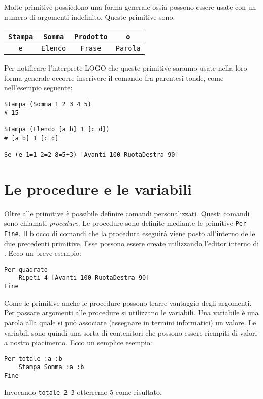 Molte primitive possiedono una forma generale ossia possono essere usate con un numero di argomenti indefinito. Queste primitive sono:
\begin{center}
	\begin{tabular}{cccc}
		\texttt{Stampa} & \texttt{Somma}&\texttt{Prodotto} &\texttt{o}\\
		\hline
		\texttt{e}&\texttt{Elenco}&\texttt{Frase}& \texttt{Parola}\\
	\end{tabular} 
\end{center}
Per notificare l'interprete LOGO che queste primitive saranno usate nella loro forma generale occorre inscrivere il comando fra parentesi tonde, come nell'esempio seguente:
\begin{lstlisting}
Stampa (Somma 1 2 3 4 5)
# 15

Stampa (Elenco [a b] 1 [c d])
# [a b] 1 [c d] 

Se (e 1=1 2=2 8=5+3) [Avanti 100 RuotaDestra 90]
\end{lstlisting}

\section{Le procedure e le variabili}

Oltre alle primitive è possibile definire comandi personalizzati. Questi comandi sono chiamati \textit{procedure}. Le procedure sono definite mediante le primitive \texttt{Per \textellipsis Fine}. Il blocco di comandi che la procedura eseguirà viene posto all'interno delle due precedenti primitive. Esse possono essere create utilizzando l'editor interno di \xlogo. Ecco un breve esempio:
\begin{lstlisting}
Per quadrato
	Ripeti 4 [Avanti 100 RuotaDestra 90]
Fine
\end{lstlisting}

Come le primitive anche le procedure possono trarre vantaggio degli argomenti. Per passare argomenti alle procedure si utilizzano le variabili. Una variabile è una parola alla quale si può associare (assegnare in termini informatici) un valore. Le variabili sono quindi una sorta di contenitori che possono essere riempiti di valori a nostro piacimento. Ecco un semplice esempio:
\begin{lstlisting}
Per totale :a :b
	Stampa Somma :a :b
Fine
\end{lstlisting} 

Invocando \texttt{totale 2 3} otterremo 5 come risultato.


